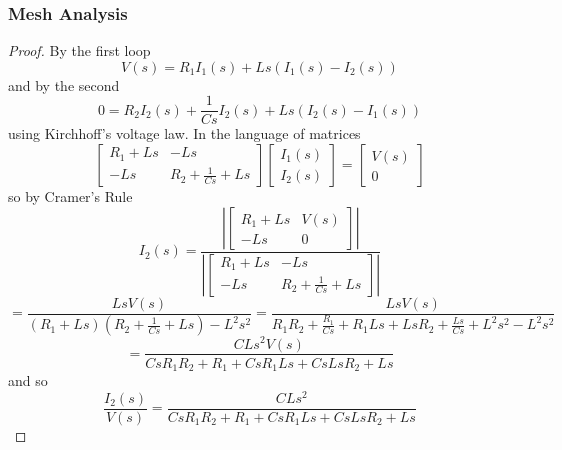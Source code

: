 \documentclass[11pt]{article}
\newcommand{\abs}[1]{\left\lvert #1 \right\rvert}%
\begin{document}
\subsubsection{Mesh Analysis}
\begin{proof}
	By the first loop
	\[V(s) = R_1I_1(s) + Ls(I_1(s) - I_2(s))\] and by the second 
	\[0 = R_2I_2(s) + \frac{1}{Cs}I_2(s) + Ls(I_2(s) - I_1(s))\]
	using Kirchhoff's voltage law. In the language of matrices
	\[\begin{bmatrix}
		R_1 + Ls & -Ls \\
		-Ls & R_2 + \frac{1}{Cs} + Ls 
	\end{bmatrix} \begin{bmatrix}
	I_1(s) \\ I_2(s)
\end{bmatrix} = \begin{bmatrix}
V(s) \\ 0
\end{bmatrix}\] so by Cramer's Rule
\[I_2(s) = \frac{\abs{\begin{bmatrix}
			R_1 + Ls & V(s) \\ -Ls & 0
\end{bmatrix}}}{\abs{\begin{bmatrix}
R_1 + Ls & -Ls \\ -Ls & R_2 + \frac{1}{Cs} + Ls 
\end{bmatrix}}}\]
\[= \frac{LsV(s)}{(R_1 + Ls)(R_2 + \frac{1}{Cs} + Ls) - L^2s^2} =  \frac{LsV(s)}{R_1R_2 + \frac{R_1}{Cs} + R_1Ls + LsR_2 + \frac{Ls}{Cs} + L^2s^2 - L^2s^2}\]
\[ =  \frac{CLs^2V(s)}{CsR_1R_2 + R_1 + CsR_1Ls + CsLsR_2 + Ls}\]
and so 
\[\frac{I_2(s)}{V(s)} =  \frac{CLs^2}{CsR_1R_2 + R_1 + CsR_1Ls + CsLsR_2 + Ls}\]
\end{proof}
\end{document}
